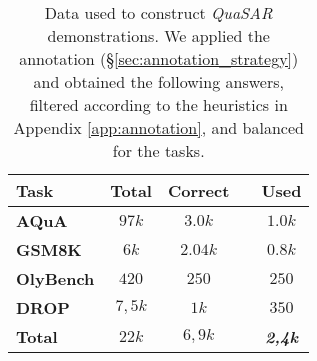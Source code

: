 \documentclass[11pt]{article}
\newcommand{\QuaSAR}{\emph{QuaSAR}\xspace}
\begin{document}
\begin{table}[h]
\small
\centering
\setlength{\tabcolsep}{3.5pt}
\begin{tabularx}{0.4\textwidth}{lcccc}
    \toprule
    \textbf{Task} & \textbf{Total} & \textbf{Correct} &  & \textbf{Used} \\
    \midrule
    \textbf{AQuA}        & $97k$ & $3.0k$ &  & $1.0k$ \\
    \textbf{GSM8K}     & $6k$ & $2.04k$ &  & $0.8k$ \\
    \textbf{OlyBench}     & $420$ & $250$ &  & $250$ \\
    \textbf{DROP}      & $7,5k$ & $1k$ &  & $350$ \\
    \hdashline
    \textbf{Total}     & $22k$   & $6,9k$ &  & \textbf{\textit{2,4k}} \\
    \bottomrule
\end{tabularx}
\caption{Data used to construct \QuaSAR demonstrations. We applied the annotation (\S \ref{sec:annotation_strategy}) and obtained the following answers, filtered according to the heuristics in Appendix \ref{app:annotation}, and balanced for the tasks. }
\label{tab:data_composition}
\end{table}
\end{document}
